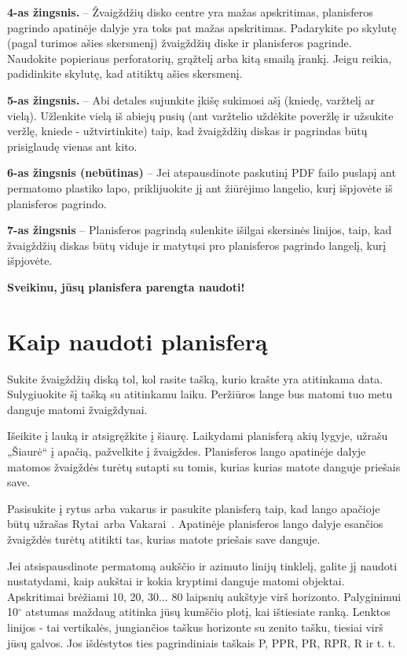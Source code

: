 \documentclass[a4paper,onecolumn,10pt]{article}
\begin{document}
{\bf 4-as žingsnis.} -- Žvaigždžių disko centre yra mažas apskritimas,
planisferos pagrindo apatinėje dalyje yra toks pat mažas apskritimas. Padarykite po skylutę
(pagal turimos ašies skersmenį) žvaigždžių diske ir planisferos pagrinde. Naudokite popieriaus perforatorių, grąžtelį arba kitą smailą įrankį. Jeigu reikia, padidinkite skylutę, kad atitiktų ašies skersmenį.

{\bf 5-as žingsnis.} -- Abi detales sujunkite įkišę sukimosi ašį (kniedę, varžtelį ar vielą). Užlenkite vielą iš abiejų pusių (ant varžtelio uždėkite poveržlę ir užsukite veržlę, kniede - užtvirtinkite) taip, kad žvaigždžių diskas ir pagrindas būtų prisiglaudę vienas ant kito.


{\bf 6-as žingsnis (nebūtinas)} -- Jei atspausdinote paskutinį PDF failo puslapį ant permatomo plastiko lapo, priklijuokite jį ant žiūrėjimo langelio, kurį išpjovėte iš planisferos pagrindo.


{\bf 7-as žingsnis} -- Planisferos pagrindą sulenkite išilgai skersinės linijos,
taip, kad žvaigždžių diskas būtų viduje ir matytųsi pro planisferos pagrindo langelį, kurį išpjovėte.


{\bf Sveikinu, jūsų planisfera parengta naudoti!}

\section*{Kaip naudoti planisferą}

Sukite žvaigždžių diską tol, kol rasite tašką, kurio krašte yra atitinkama data.
Sulygiuokite šį tašką su atitinkamu laiku. Peržiūros lange bus matomi tuo metu danguje 
matomi žvaigždynai.

Išeikite į lauką ir atsigręžkite į šiaurę. Laikydami planisferą akių lygyje, užrašu „Šiaurė“ į apačią, pažvelkite į žvaigždes. Planisferos lango apatinėje dalyje matomos žvaigždės turėtų sutapti su tomis, kurias kurias matote danguje priešais save.



Pasisukite į rytus arba vakarus ir pasukite planisferą taip, kad lango apačioje būtų užrašas \guillemotleft Rytai\guillemotright\ arba \guillemotleft Vakarai\guillemotright\ . Apatinėje planisferos lango dalyje esančios žvaigždės turėtų atitikti tas, kurias matote priešais save danguje.

Jei atsispausdinote permatomą aukščio ir azimuto linijų tinklelį, galite jį naudoti nustatydami, kaip aukštai ir kokia kryptimi danguje matomi objektai. Apskritimai brėžiami 10, 20, 30... 80 laipsnių aukštyje virš horizonto. Palyginimui 10$^\circ$ atstumas maždaug atitinka jūsų kumščio plotį, kai ištiesiate ranką. Lenktos linijos - tai vertikalės, jungiančios taškus horizonte su zenito tašku, tiesiai virš jūsų galvos. Jos išdėstytos ties pagrindiniais taškais P, PPR, PR, RPR, R ir t. t.
\end{document}
